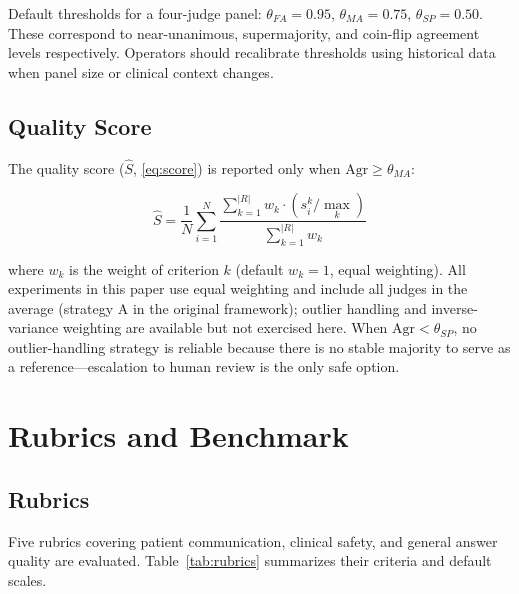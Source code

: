 \documentclass[conference]{IEEEtran}
\begin{document}
Default thresholds for a four-judge panel: $\theta_{FA}=0.95$,
$\theta_{MA}=0.75$, $\theta_{SP}=0.50$. These correspond to
near-unanimous, supermajority, and coin-flip agreement levels
respectively. Operators should recalibrate thresholds using historical
data when panel size or clinical context changes.

\subsection{Quality Score}

The quality score ($\hat{S}$, \ref{eq:score}) is reported only when $\mathrm{Agr} \geq \theta_{MA}$:

\begin{equation}
\hat{S} = \frac{1}{N}\sum_{i=1}^{N}
\frac{\sum_{k=1}^{|R|} w_k \cdot (s_i^k / \max_k)}{\sum_{k=1}^{|R|} w_k}
\label{eq:score}
\end{equation}

\noindent where $w_k$ is the weight of criterion $k$ (default $w_k=1$,
equal weighting). All experiments in this paper use equal weighting
and include all judges in the average (strategy A in the original
framework); outlier handling and inverse-variance weighting are
available but not exercised here. When $\mathrm{Agr} < \theta_{SP}$,
no outlier-handling strategy is reliable because there is no stable
majority to serve as a reference---escalation to human review is the
only safe option.

\section{Rubrics and Benchmark}

\subsection{Rubrics}

Five rubrics covering patient communication, clinical safety, and
general answer quality are evaluated. Table~\ref{tab:rubrics}
summarizes their criteria and default scales.
\end{document}
